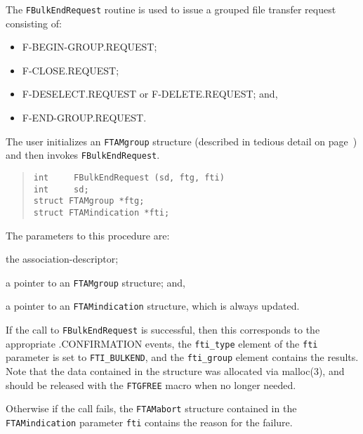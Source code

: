 The \verb"FBulkEndRequest" routine is used to issue a grouped file transfer
request consisting of:
\begin{itemize}
\item	{\sf F-BEGIN-GROUP.REQUEST\/};

\item	{\sf F-CLOSE.REQUEST\/};

\item	{\sf F-DESELECT.REQUEST\/} or {\sf F-DELETE.REQUEST\/};
and,

\item	{\sf F-END-GROUP.REQUEST}.
\end{itemize}
The user initializes an \verb"FTAMgroup" structure
(described in tedious detail on page~\pageref{FTAMgroup})
and then invokes \verb"FBulkEndRequest".
\begin{quote}\small\begin{verbatim}
int     FBulkEndRequest (sd, ftg, fti)
int     sd;
struct FTAMgroup *ftg;
struct FTAMindication *fti;
\end{verbatim}\end{quote}
The parameters to this procedure are:
\begin{describe}
\item[\verb"sd":] the association-descriptor;

\item[\verb"ftg":] a pointer to an \verb"FTAMgroup" structure;
and,

\item[\verb"fti":] a pointer to an \verb"FTAMindication" structure, which is
always updated.
\end{describe}
If the call to \verb"FBulkEndRequest" is successful,
then this corresponds to the appropriate {\sf .CONFIRMATION\/} events,
the \verb"fti_type" element of the \verb"fti" parameter is set to
\verb"FTI_BULKEND",
and the \verb"fti_group" element contains the results.
Note that the data contained in the structure was allocated via \man malloc(3),
and should be released with the \verb"FTGFREE" macro when no longer needed.

Otherwise if the call fails,
the \verb"FTAMabort" structure contained in the
\verb"FTAMindication" parameter \verb"fti" contains the reason for the failure.

